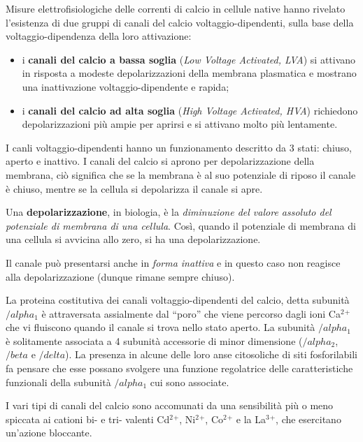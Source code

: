 \documentclass[]{article}
\begin{document}
Misure elettrofisiologiche delle correnti di calcio in cellule native
hanno rivelato l'esistenza di due gruppi di canali del calcio
voltaggio-dipendenti, sulla base della voltaggio-dipendenza della loro
attivazione:

\begin{itemize}
\itemsep1pt\parskip0pt
\item
  i \textbf{canali del calcio a bassa soglia} (\emph{Low Voltage
  Activated, LVA}) si attivano in risposta a modeste depolarizzazioni
  della membrana plasmatica e mostrano una inattivazione
  voltaggio-dipendente e rapida;
\item
  i \textbf{canali del calcio ad alta soglia} (\emph{High Voltage
  Activated, HVA}) richiedono depolarizzazioni più ampie per aprirsi e
  si attivano molto più lentamente.
\end{itemize}

I canli voltaggio-dipendenti hanno un funzionamento descritto da 3
stati: chiuso, aperto e inattivo. I canali del calcio si aprono per
depolarizzazione della membrana, ciò significa che se la membrana è al
suo potenziale di riposo il canale è chiuso, mentre se la cellula si
depolarizza il canale si apre.

Una \textbf{depolarizzazione}, in biologia, è la \emph{diminuzione del
valore assoluto del potenziale di membrana di una cellula}. Così, quando
il potenziale di membrana di una cellula si avvicina allo zero, si ha
una depolarizzazione.

Il canale può presentarsi anche in \emph{forma inattiva} e in questo
caso non reagisce alla depolarizzazione (dunque rimane sempre chiuso).

La proteina costitutiva dei canali voltaggio-dipendenti del calcio,
detta subunità \(/alpha\)\(_1\) è attraversata assialmente dal ``poro''
che viene percorso dagli ioni Ca\(^2\)\(^+\) che vi fluiscono quando il
canale si trova nello stato aperto. La subunità \(/alpha\)\(_1\) è
solitamente associata a 4 subunità accessorie di minor dimensione
(\(/alpha\)\(_2\), \(/beta\) e \(/delta\)). La presenza in alcune delle
loro anse citosoliche di siti fosforilabili fa pensare che esse possano
svolgere una funzione regolatrice delle caratteristiche funzionali della
subunità \(/alpha\)\(_1\) cui sono associate.

I vari tipi di canali del calcio sono accomunati da una sensibilità più
o meno spiccata ai cationi bi- e tri- valenti Cd\(^2\)\(^+\),
Ni\(^2\)\(^+\), Co\(^2\)\(^+\) e la La\(^3\)\(^+\), che esercitano
un'azione bloccante.
\end{document}
